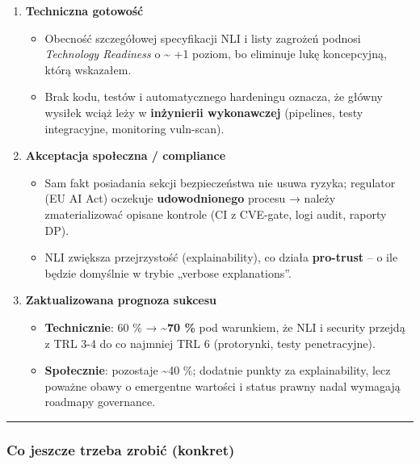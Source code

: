 \documentclass[letterpaper,twocolumn]{article}
\providecommand{\tightlist}{%
  \setlength{\itemsep}{0pt}\setlength{\parskip}{0pt}}
\begin{document}
\begin{enumerate}
\def\labelenumi{\arabic{enumi}.}
\item
  \textbf{Techniczna gotowość}

  \begin{itemize}
  \tightlist
  \item
    Obecność szczegółowej specyfikacji NLI i listy zagrożeń podnosi
    \emph{Technology Readiness} o \textasciitilde{} +1 poziom, bo
    eliminuje lukę koncepcyjną, którą wskazałem.
  \item
    Brak kodu, testów i automatycznego hardeningu oznacza, że główny
    wysiłek wciąż leży w \textbf{inżynierii wykonawczej} (pipelines,
    testy integracyjne, monitoring vuln-scan).
  \end{itemize}
\item
  \textbf{Akceptacja społeczna / compliance}

  \begin{itemize}
  \tightlist
  \item
    Sam fakt posiadania sekcji bezpieczeństwa nie usuwa ryzyka;
    regulator (EU AI Act) oczekuje \textbf{udowodnionego} procesu →
    należy zmaterializować opisane kontrole (CI z CVE-gate, logi audit,
    raporty DP).
  \item
    NLI zwiększa przejrzystość (explainability), co działa
    \textbf{pro-trust} -- o ile będzie domyślnie w trybie „verbose
    explanations''.
  \end{itemize}
\item
  \textbf{Zaktualizowana prognoza sukcesu}

  \begin{itemize}
  \tightlist
  \item
    \textbf{Technicznie}: 60 \% → \textbf{\textasciitilde70 \%} pod
    warunkiem, że NLI i security przejdą z TRL 3-4 do co najmniej TRL 6
    (protorynki, testy penetracyjne).
  \item
    \textbf{Społecznie}: pozostaje \textasciitilde40 \%; dodatnie punkty
    za explainability, lecz poważne obawy o emergentne wartości i status
    prawny nadal wymagają roadmapy governance.
  \end{itemize}
\end{enumerate}

\begin{center}\rule{0.5\linewidth}{0.5pt}\end{center}

\hypertarget{co-jeszcze-trzeba-zrobiux107-konkret}{%
\subsubsection{Co jeszcze trzeba zrobić
(konkret)}\label{co-jeszcze-trzeba-zrobiux107-konkret}}
\end{document}
